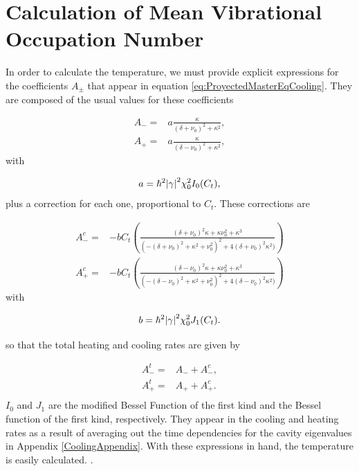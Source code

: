 \documentclass[reprint, amsmath,amssymb, aps,pra]{revtex4-1}
\begin{document}
\section{Calculation of Mean Vibrational Occupation Number}\label{NumCal}

In order to calculate the temperature, we must provide explicit expressions for the coefficients $A_\pm$ that appear in equation \eqref{eq:ProyectedMasterEqCooling}.  They are composed of the usual values for these coefficients\citep{LCNooshi}

\begin{align}
A_- =& a\frac{\kappa}{(\delta+\nu_0)^2+\kappa^2},\\
A_+ =& a\frac{\kappa}{(\delta-\nu_0)^2+\kappa^2},
\end{align} with 

\begin{equation}
a = \hbar^2\abs{\gamma}^2\chi_0^2 I_0(C_t),
\end{equation} plus a correction for each one, proportional to  $C_t$. These corrections are

\begin{align}
A_-^c=& -bC_t(\frac{(\delta+\nu_0)^2\kappa+ \kappa\nu_0^2 + \kappa^3}{(-(\delta+\nu_0)^2+\kappa^2+\nu_0^2)^2+4(\delta+\nu_0)^2\kappa^2)})\\
A_+^c=& -bC_t(\frac{(\delta-\nu_0)^2\kappa+ \kappa\nu_0^2 + \kappa^3}{(-(\delta-\nu_0)^2+\kappa^2+\nu_0^2)^2+4(\delta-\nu_0)^2\kappa^2)})
\end{align} with

\begin{equation}
b= \hbar^2\abs{\gamma}^2\chi_0^2 J_1(C_t).
\end{equation}

so that the total heating and cooling rates are given by

\begin{align}
A_-^t =& A_- + A_-^c,\\
A_+^t =& A_+ + A_+^c.\\
\end{align}
$I_0$ and $J_1$ are the modified Bessel Function of the first kind and
the Bessel function of the first kind, respectively. They appear in
the cooling and heating rates as a result of averaging out the time
dependencies for the cavity eigenvalues in Appendix
\ref{CoolingAppendix}.
With these expressions in hand, the temperature is easily calculated.
.
\end{document}
